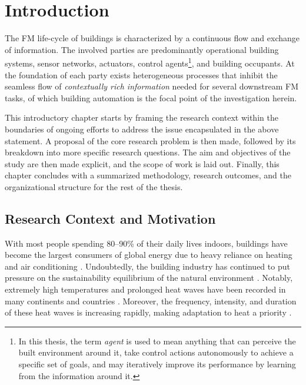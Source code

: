 \chapter{Introduction}
\label{chap:introduction}

The \ac{FM} life-cycle of buildings is characterized by a continuous flow and exchange of information. The involved parties are predominantly operational building systems, sensor networks, actuators, control agents\footnote{In this thesis, the term \textit{agent} is used to mean anything that can perceive the built environment around it, take control actions autonomously to achieve a specific set of goals, and may iteratively improve its performance by learning from the information around it. }, and building occupants. At the foundation of each party exists heterogeneous processes that inhibit the seamless flow of \textit{contextually rich information} needed for several downstream \ac{FM} tasks, of which building automation is the focal point of the investigation herein.

This introductory chapter starts by framing the research context within the boundaries of ongoing efforts to address the issue encapsulated in the above statement. A proposal of the core research problem is then made, followed by its breakdown into more specific research questions. The aim and objectives of the study are then made explicit, and the scope of work is laid out. Finally, this chapter concludes with a summarized methodology, research outcomes, and the organizational structure for the rest of the thesis.  

\section{Research Context and Motivation}
With most people spending 80–90\% of their daily lives indoors, buildings have become the largest consumers of global energy due to heavy reliance on heating and air conditioning \citep{ASHRAE2016GuidelineEnvironments, Mannan2021IndoorStructure}. Undoubtedly, the building industry has continued to put pressure on the sustainability equilibrium of the natural environment \citep{Dong2021GreenhouseCountries, Woods2022HumiditysConditioning}. Notably, extremely high temperatures and prolonged heat waves have been recorded in many continents and countries \citep{Somerville2012HeatChange, Akompab2013AwarenessAustralia, Junk2019FutureIndicators, Hopke2020ConnectingWildfires, Miller2021HeatOutput, Barriopedro2023HeatChallenges, Elia2024CouplingGradient}. Moreover, the frequency, intensity, and duration of these heat waves is increasing rapidly, making adaptation to heat a priority \citep{Peng2011TowardChange, Mitchell2016AttributingChange,  Baniassadi2018EnergyCodes, Alam2019BalancingDesign, Kriebel-Gasparro2022ClimateAdult}. 

